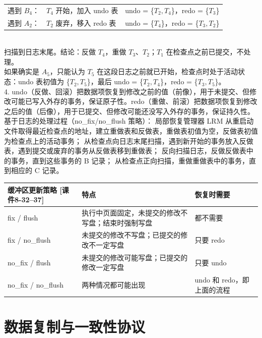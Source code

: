 \documentclass[10pt,a4paper]{article}
\newcommand{\cir}[1]{\ding{\numexpr171+#1\relax}}
\newcommand{\kj}[1]{\textsf{\small[课件#1]}}
\newenvironment{keep}{\par\noindent\begin{minipage}{\linewidth}\setlength{\parskip}{3pt plus 1pt}}{\end{minipage}\par\vspace{2pt}}
\begin{document}
\begin{keep}
\begin{ans}[2023 年第二题]
{\begin{tabular}{@{}lll@{}}
遇到 $B_4$：& $T_4$ 开始，加入 undo 表 & undo = \{$T_2,T_4$\}，redo = \{$T_3$\}\\
遇到 $A_2$：& $T_2$ 废弃，移入 redo 表 & undo = \{$T_4$\}，redo = \{$T_3,T_2$\}\\
\end{tabular}}\\
\hspace*{1em}\cir{3} 扫描到日志末尾。结论：反做 $T_4$，重做 $T_3$、$T_2$；$T_1$ 在检查点之前已提交，不处理。\\
\hspace*{1em}如果确实是 $A_5$，只能认为 $T_5$ 在这段日志之前就已开始，检查点时处于活动状态：undo 表初值为 \{$T_2,T_5$\}，最后 undo = \{$T_2,T_4$\}，redo = \{$T_3,T_5$\}。\\[2pt]
4. undo（反做、回滚）把数据项恢复到修改之前的值（前像），用于未提交、但修改可能已写入外存的事务，保证原子性。redo（重做、前滚）把数据项恢复到修改之后的值（后像），用于已提交、但修改可能还没写入外存的事务，保证持久性。
基于日志的处理过程（no\_fix/no\_flush 策略）：\cir{1} 局部恢复管理器 LRM 从重启动文件取得最近检查点的地址，建立重做表和反做表，重做表初值为空，反做表初值为检查点上的活动事务；\cir{2} 从检查点向日志末尾扫描，遇到新开始的事务放入反做表，遇到提交或废弃的事务从反做表移到重做表；\cir{3} 反向扫描日志，反做反做表中的事务，直到这些事务的 B 记录；\cir{4} 从检查点正向扫描，重做重做表中的事务，直到相应的 C 记录。
\end{ans}
\end{keep}

{\small
\begin{tabularx}{\linewidth}{@{}l X l@{}}
\toprule
缓冲区更新策略 \kj{8-32--37} & 特点 & 恢复时需要\\ \midrule
fix / flush & 执行中页面固定，未提交的修改不写盘；结束时强制写盘 & 都不需要 \\
fix / no\_flush & 未提交的修改不写盘；已提交的修改不一定写盘 & 只要 redo \\
no\_fix / flush & 未提交的修改可能写盘；已提交的修改一定写盘 & 只要 undo \\
no\_fix / no\_flush & 两种情况都可能出现 & undo 和 redo，即上面的流程 \\
\bottomrule
\end{tabularx}}

\clearpage
\section{数据复制与一致性协议}
\end{document}
